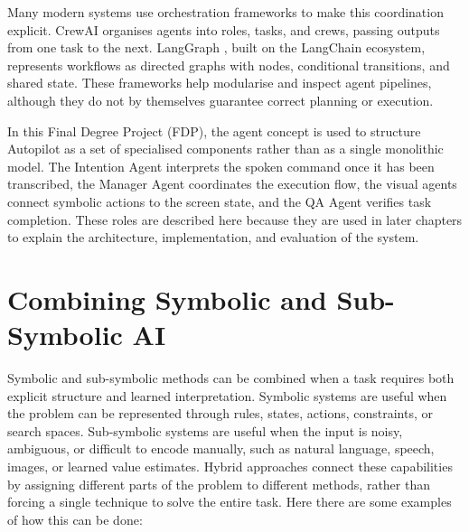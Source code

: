 Many modern systems use orchestration frameworks to make this coordination explicit. CrewAI \cite{CrewAI2023} organises agents into roles, tasks, and crews, passing outputs from one task to the next. LangGraph \cite{LangGraph2024}, built on the LangChain ecosystem, represents workflows as directed graphs with nodes, conditional transitions, and shared state. These frameworks help modularise and inspect agent pipelines, although they do not by themselves guarantee correct planning or execution.

In this Final Degree Project (FDP), the agent concept is used to structure Autopilot as a set of specialised components rather than as a single monolithic model. The Intention Agent interprets the spoken command once it has been transcribed, the Manager Agent coordinates the execution flow, the visual agents connect symbolic actions to the screen state, and the QA Agent verifies task completion. These roles are described here because they are used in later chapters to explain the architecture, implementation, and evaluation of the system.

\section{Combining Symbolic and Sub-Symbolic AI}
\label{sec:combining_symbolic_subsymbolic}

Symbolic and sub-symbolic methods can be combined when a task requires both explicit structure and learned interpretation. Symbolic systems are useful when the problem can be represented through rules, states, actions, constraints, or search spaces. Sub-symbolic systems are useful when the input is noisy, ambiguous, or difficult to encode manually, such as natural language, speech, images, or learned value estimates. Hybrid approaches connect these capabilities by assigning different parts of the problem to different methods, rather than forcing a single technique to solve the entire task. Here there are some examples of how this can be done:

